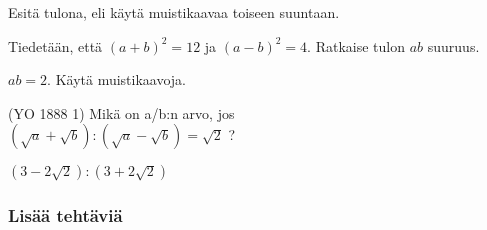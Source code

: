 \begin{tehtavasivu}
\begin{tehtava}
    Esitä tulona, eli käytä muistikaavaa toiseen suuntaan.
    \begin{alakohdat}
    \end{alakohdat}
    \begin{vastaus}
        \begin{alakohdat}
        \end{alakohdat}
    \end{vastaus}
\end{tehtava}

\begin{tehtava}
	Tiedetään, että $(a+b)^2=12$ ja $(a-b)^2=4$. Ratkaise tulon $ab$ suuruus.
    \begin{vastaus}
	$ab = 2$. Käytä muistikaavoja.
    \end{vastaus}
\end{tehtava}

\begin{tehtava}
(YO 1888 1) Mikä on a/b:n arvo, jos \\
$ (\sqrt{a}+\sqrt{b}):(\sqrt{a}-\sqrt{b})=\sqrt{2}$ ?
\begin{vastaus}
$(3-2\sqrt{2}):(3+2\sqrt{2})$
\end{vastaus}
\end{tehtava}


\subsubsection*{Lisää tehtäviä}


\end{tehtavasivu}
